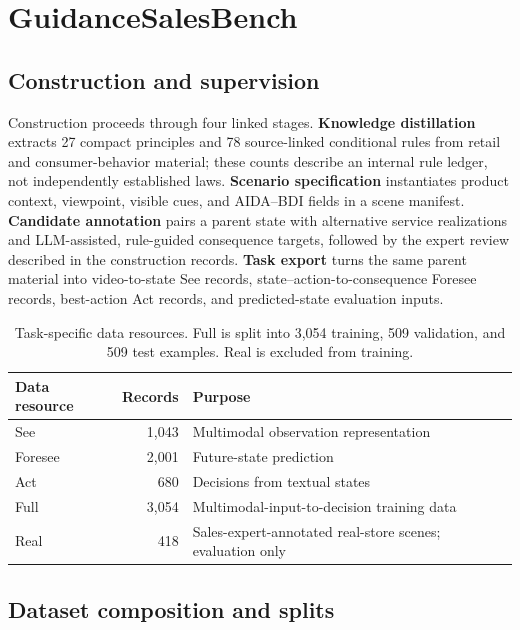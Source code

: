 \documentclass{article}
\begin{document}
\section{GuidanceSalesBench}\label{guidancesalesbench}

\subsection{Construction and
supervision}\label{construction-and-supervision}

Construction proceeds through four linked stages. \textbf{Knowledge
distillation} extracts 27 compact principles and 78 source-linked
conditional rules from retail and consumer-behavior material; these
counts describe an internal rule ledger, not independently established
laws. \textbf{Scenario specification} instantiates product context,
viewpoint, visible cues, and AIDA--BDI fields in a scene manifest.
\textbf{Candidate annotation} pairs a parent state with alternative
service realizations and LLM-assisted, rule-guided consequence targets,
followed by the expert review described in the construction records.
\textbf{Task export} turns the same parent material into video-to-state
See records, state--action-to-consequence Foresee records, best-action
Act records, and predicted-state evaluation inputs.


\begin{table}[tbp]
\centering\small
\setlength{\tabcolsep}{4pt}
\renewcommand{\arraystretch}{1.15}
\begin{tabularx}{\linewidth}{@{}lrX@{}}
\toprule
Data resource & Records & Purpose \\
\midrule
See & 1,043 & Multimodal observation representation \\
Foresee & 2,001 & Future-state prediction \\
Act & 680 & Decisions from textual states \\
Full & 3,054 & Multimodal-input-to-decision training data \\
Real & 418 & Sales-expert-annotated real-store scenes; evaluation only \\
\bottomrule
\end{tabularx}
\caption{Task-specific data resources. Full is split into 3,054 training, 509 validation, and 509 test examples. Real is excluded from training.}
\label{tab:results-2}
\end{table}

\subsection{Dataset composition and splits}
\label{dataset-composition}
\end{document}
